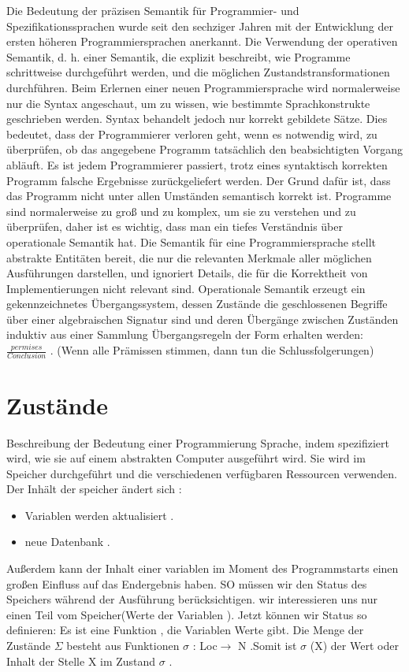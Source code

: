\documentclass[a4paper,12pt,twoside,headsepline]{scrartcl}
\begin{document}
Die Bedeutung der präzisen Semantik für Programmier- und Spezifikationssprachen wurde seit den sechziger Jahren mit der Entwicklung der ersten höheren Programmiersprachen anerkannt. 
Die Verwendung der operativen Semantik, d. h. einer Semantik, die explizit beschreibt, wie Programme schrittweise durchgeführt werden, und die möglichen Zustandstransformationen durchführen. 
Beim Erlernen einer neuen Programmiersprache wird normalerweise nur die Syntax angeschaut, um zu wissen, wie bestimmte Sprachkonstrukte geschrieben werden. Syntax behandelt jedoch nur korrekt gebildete Sätze. 
Dies bedeutet, dass der Programmierer verloren geht, wenn es notwendig wird, zu überprüfen, ob das angegebene Programm tatsächlich den beabsichtigten Vorgang abläuft. Es ist jedem Programmierer passiert, trotz eines syntaktisch korrekten Programm falsche Ergebnisse zurückgeliefert werden. Der Grund dafür ist, dass das Programm nicht unter allen Umständen semantisch korrekt ist. Programme sind normalerweise zu groß und zu komplex, um sie zu verstehen und zu überprüfen, daher ist es wichtig, dass man ein tiefes Verständnis über operationale Semantik hat.
 Die Semantik für eine Programmiersprache stellt abstrakte Entitäten bereit, die nur die relevanten Merkmale aller möglichen Ausführungen darstellen, und ignoriert Details, die für die Korrektheit von Implementierungen nicht relevant sind. Operationale Semantik erzeugt ein gekennzeichnetes Übergangssystem, dessen Zustände die geschlossenen Begriffe über einer algebraischen Signatur sind und deren Übergänge zwischen Zuständen induktiv aus einer Sammlung  Übergangsregeln der Form erhalten werden:
 $\frac{ permises} {Conclusion}$ . (Wenn alle Prämissen stimmen, dann tun die Schlussfolgerungen)

\section{Zustände}
Beschreibung der Bedeutung einer Programmierung
Sprache, indem spezifiziert wird, wie sie auf einem abstrakten Computer ausgeführt wird.
Sie wird im Speicher durchgeführt und die verschiedenen verfügbaren Ressourcen verwenden. 
Der Inhält der speicher ändert sich :
\begin{itemize}
	\item Variablen werden aktualisiert .
	\item neue Datenbank .
\end{itemize}
Außerdem kann der Inhalt einer variablen im Moment des
Programmstarts  einen großen Einfluss auf das Endergebnis haben.
SO müssen wir den Status des Speichers während der Ausführung berücksichtigen.
wir interessieren uns nur einen Teil vom Speicher(Werte der Variablen ).
Jetzt können wir Status so definieren:
 Es ist eine Funktion , die Variablen Werte  gibt.
 Die Menge der Zustände $\Sigma$ besteht aus Funktionen $\sigma$ : Loc$\rightarrow$ N .Somit ist $\sigma$ (X) der Wert oder Inhalt der Stelle X im Zustand $\sigma$ .
\end{document}
